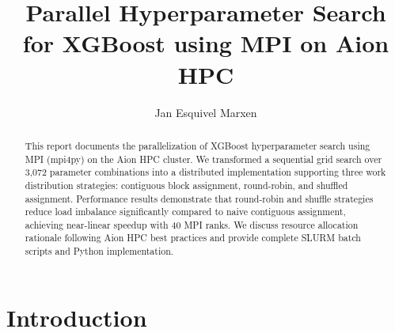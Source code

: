\documentclass[sigplan,screen]{acmart}
\begin{document}
\title{Parallel Hyperparameter Search for XGBoost using MPI on Aion HPC}


\author{Jan Esquivel Marxen}

\renewcommand{\shortauthors}{Marxen}

\begin{abstract}
  This report documents the parallelization of XGBoost hyperparameter
  search using MPI (mpi4py) on the Aion HPC cluster. We transformed a
  sequential grid search over 3,072 parameter combinations into a
  distributed implementation supporting three work distribution
  strategies: contiguous block assignment, round-robin, and shuffled
  assignment. Performance results demonstrate that round-robin and shuffle
  strategies reduce load imbalance significantly compared to naive
  contiguous assignment, achieving near-linear speedup with 40 MPI ranks.
  We discuss resource allocation rationale following Aion HPC best
  practices and provide complete SLURM batch scripts and Python
  implementation.
\end{abstract}


\maketitle

\section{Introduction}
\end{document}
